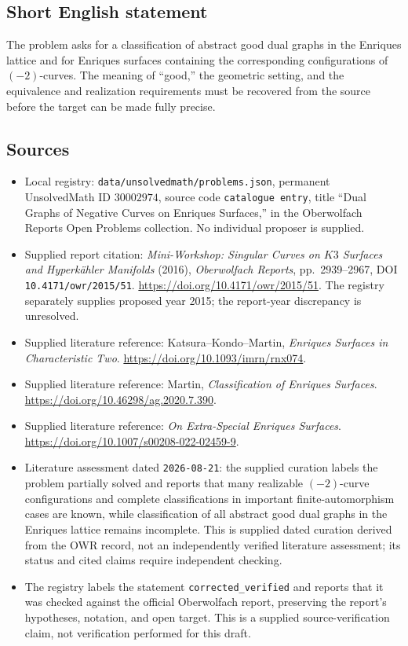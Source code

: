 \documentclass[11pt]{article}
\begin{document}
\subsection{Short English statement}
The problem asks for a classification of abstract good dual graphs in the Enriques lattice and for Enriques surfaces containing the corresponding configurations of \((-2)\)-curves. The meaning of ``good,'' the geometric setting, and the equivalence and realization requirements must be recovered from the source before the target can be made fully precise.
\subsection{Sources}
\begin{itemize}
\item Local registry: \texttt{data/unsolvedmath/problems.json}, permanent UnsolvedMath ID \(30002974\), source code \texttt{catalogue entry}, title ``Dual Graphs of Negative Curves on Enriques Surfaces,'' in the Oberwolfach Reports Open Problems collection. No individual proposer is supplied.
\item Supplied report citation: \emph{Mini-Workshop: Singular Curves on \(K3\) Surfaces and Hyperkähler Manifolds} (2016), \emph{Oberwolfach Reports}, pp.~2939--2967, DOI \texttt{10.4171/owr/2015/51}. \url{https://doi.org/10.4171/owr/2015/51}. The registry separately supplies proposed year 2015; the report-year discrepancy is unresolved.
\item Supplied literature reference: Katsura--Kondo--Martin, \emph{Enriques Surfaces in Characteristic Two}. \url{https://doi.org/10.1093/imrn/rnx074}.
\item Supplied literature reference: Martin, \emph{Classification of Enriques Surfaces}. \url{https://doi.org/10.46298/ag.2020.7.390}.
\item Supplied literature reference: \emph{On Extra-Special Enriques Surfaces}. \url{https://doi.org/10.1007/s00208-022-02459-9}.
\item Literature assessment dated \texttt{2026-08-21}: the supplied curation labels the problem partially solved and reports that many realizable \((-2)\)-curve configurations and complete classifications in important finite-automorphism cases are known, while classification of all abstract good dual graphs in the Enriques lattice remains incomplete. This is supplied dated curation derived from the OWR record, not an independently verified literature assessment; its status and cited claims require independent checking.
\item The registry labels the statement \texttt{corrected\_verified} and reports that it was checked against the official Oberwolfach report, preserving the report's hypotheses, notation, and open target. This is a supplied source-verification claim, not verification performed for this draft.
\end{itemize}
\end{document}
